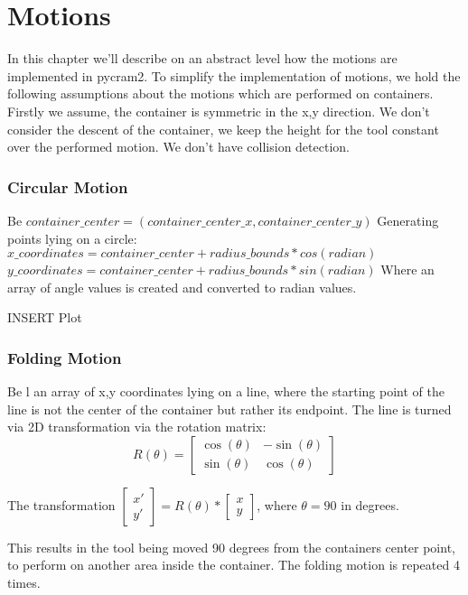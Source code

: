 \chapter*{Motions}
\label{chap:Motions}

In this chapter we'll describe on an abstract level how the motions are implemented in pycram2.
To simplify the implementation of motions, we hold the following assumptions about the motions which are performed on containers.
Firstly we assume, the container is symmetric in the x,y direction. We don't consider the descent of the container, we keep the height for the tool
constant over the performed motion. We don't have collision detection.

\subsection*{Circular Motion}
Be $container\_center = (container\_center\_x, container\_center\_y)$
Generating points lying on a circle:
$x\_coordinates = container\_center + radius\_bounds * cos(radian)$
$y\_coordinates = container\_center + radius\_bounds * sin(radian)$
Where an array of angle values is created and converted to radian values. 

INSERT Plot

\subsection{Folding Motion}
Be l an array of x,y coordinates lying on a line, where the starting point of the line is not the center of the container but rather its endpoint.
The line is turned via 2D transformation via the rotation matrix: 
\[R(\theta) = \begin{bmatrix}
   \cos(\theta) & -\sin(\theta) \\
   \sin(\theta) & \cos(\theta)
    \end{bmatrix}
\]

The transformation $\begin{bmatrix} x' \\ y' \end{bmatrix} = R(\theta) * \begin{bmatrix} x \\ y \end{bmatrix}$, where 
$\theta=90$ in degrees. 

This results in the tool being moved 90 degrees from the containers center point, to perform on another area inside the container.
The folding motion is repeated 4 times. 

